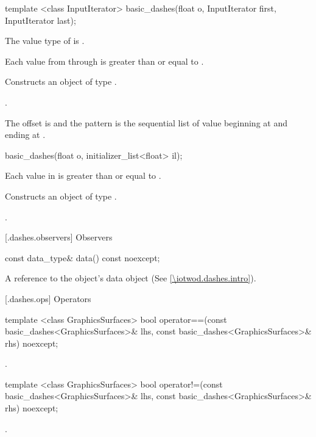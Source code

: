 %
\begin{itemdecl}
template <class InputIterator>
basic_dashes(float o, InputIterator first, InputIterator last);
\end{itemdecl}
\begin{itemdescr}
\pnum
\requires
The value type of  is .

\pnum
Each value from  through  is greater than or equal to .

\pnum
\effects
Constructs an object of type .

\pnum
\postconditions
{}.

\pnum
\remarks
The offset is  and the pattern is the sequential list of value beginning at  and ending at .
\end{itemdescr}

%
\begin{itemdecl}
basic_dashes(float o, initializer_list<float> il);
\end{itemdecl}
\begin{itemdescr}
\pnum
\requires
Each value in  is greater than or equal to .

\pnum
\effects
Constructs an object of type .

\pnum
\postconditions
{}.
\end{itemdescr}

 [\iotwod.dashes.observers] {Observers}

\begin{itemdecl}
const data_type& data() const noexcept;
\end{itemdecl}
\begin{itemdescr}
\pnum
\returns
A reference to the  object's data object (See \ref{\iotwod.dashes.intro}).
\end{itemdescr}

 [\iotwod.dashes.ops] {Operators}

\pnum
\begin{itemdecl}
template <class GraphicsSurfaces>
bool operator==(const basic_dashes<GraphicsSurfaces>& lhs,
  const basic_dashes<GraphicsSurfaces>& rhs) noexcept;
\end{itemdecl}
\begin{itemdescr}
\pnum
\returns
{}.
\end{itemdescr}

\pnum
\begin{itemdecl}
template <class GraphicsSurfaces>
bool operator!=(const basic_dashes<GraphicsSurfaces>& lhs,
  const basic_dashes<GraphicsSurfaces>& rhs) noexcept;
\end{itemdecl}
\begin{itemdescr}
\pnum
\returns
{}.
\end{itemdescr}
